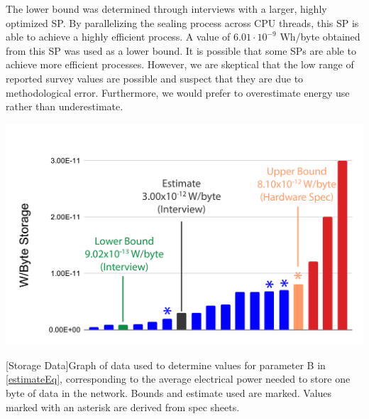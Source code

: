 \documentclass[9pt, oneside]{article}   	%
\begin{document}
\begin{multicols}{2}
The lower bound was determined through interviews with a larger, highly optimized SP. By parallelizing the sealing process across CPU threads, this SP is able to achieve a highly efficient process. A value of $6.01 \cdot 10^{-9}$ Wh/byte obtained from this SP was used as a lower bound. It is possible that some SPs are able to achieve more efficient processes. However, we are skeptical that the low range of reported survey values are possible and suspect that they are due to methodological error. Furthermore, we would prefer to overestimate energy use rather than underestimate.

\end{multicols}
\begin{center}
\includegraphics[width=.8\columnwidth]{20211023_StorageValues_withRefDrives}
\begin{flushleft}
[Storage Data]{Graph of data used to determine values for parameter B in \ref{estimateEq}, corresponding to the average electrical power needed to store one byte of data in the network. Bounds and estimate used are marked. Values marked with an asterisk are derived from spec sheets.}
\label{storageEnergyFigure}
\end{flushleft}
\end{center}
\end{document}
